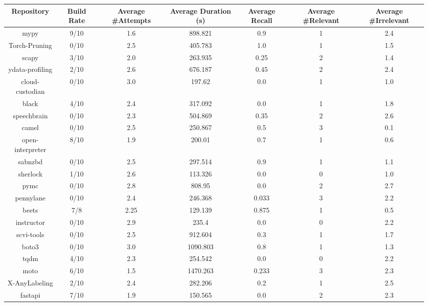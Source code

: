 \documentclass[conference]{IEEEtran}
\begin{document}
\begin{table}[!h]
    \centering
    \begin{tabular}{|c|c|c|c|c|c|c|}
    \hline
        \textbf{Repository} & \textbf{Build Rate} & \textbf{Average \#Attempts} & \textbf{Average Duration (s)} & \textbf{Average Recall} & \textbf{Average \#Relevant} & \textbf{Average \#Irrelevant} \\ \hline
        mypy & 9/10 & 1.6 & 898.821 & 0.9 & 1 & 2.4 \\ \hline
        Torch-Pruning & 0/10 & 2.5 & 405.783 & 1.0 & 1 & 1.5 \\ \hline
        scapy & 3/10 & 2.0 & 263.935 & 0.25 & 2 & 1.4 \\ \hline
        ydata-profiling & 2/10 & 2.6 & 676.187 & 0.45 & 2 & 2.4 \\ \hline
        cloud-custodian & 0/10 & 3.0 & 197.62 & 0.0 & 1 & 1.0 \\ \hline
        black & 4/10 & 2.4 & 317.092 & 0.0 & 1 & 1.8 \\ \hline
        speechbrain & 0/10 & 2.3 & 504.869 & 0.35 & 2 & 2.6 \\ \hline
        camel & 0/10 & 2.5 & 250.867 & 0.5 & 3 & 0.1 \\ \hline
        open-interpreter & 8/10 & 1.9 & 200.01 & 0.7 & 1 & 0.6 \\ \hline
        sabnzbd & 0/10 & 2.5 & 297.514 & 0.9 & 1 & 1.1 \\ \hline
        sherlock & 1/10 & 2.6 & 113.326 & 0.0 & 0 & 1.0 \\ \hline
        pymc & 0/10 & 2.8 & 808.95 & 0.0 & 2 & 2.7 \\ \hline
        pennylane & 0/10 & 2.4 & 246.368 & 0.033 & 3 & 2.2 \\ \hline
        beets & 7/8 & 2.25 & 129.139 & 0.875 & 1 & 0.5 \\ \hline
        instructor & 0/10 & 2.9 & 235.4 & 0.0 & 0 & 2.2 \\ \hline
        scvi-tools & 0/10 & 2.5 & 912.604 & 0.3 & 1 & 1.7 \\ \hline
        boto3 & 0/10 & 3.0 & 1090.803 & 0.8 & 1 & 1.3 \\ \hline
        tqdm & 4/10 & 2.3 & 254.542 & 0.0 & 0 & 2.2 \\ \hline
        moto & 6/10 & 1.5 & 1470.263 & 0.233 & 3 & 2.3 \\ \hline
        X-AnyLabeling & 2/10 & 2.4 & 282.206 & 0.2 & 1 & 2.5 \\ \hline
        fastapi & 7/10 & 1.9 & 150.565 & 0.0 & 2 & 2.3 \\ \hline

\end{tabular}
\end{table}
\end{document}
